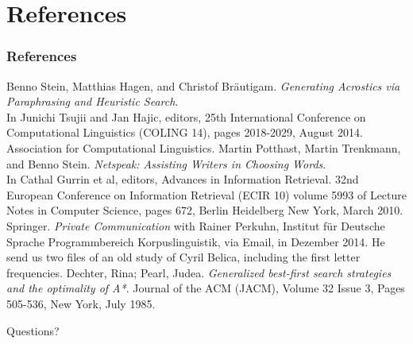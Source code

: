 \documentclass{beamer}
\begin{document}
\section{References}

\begin{frame}
\frametitle{References}
\scriptsize
\begin{thebibliography}{1}
	Benno Stein, Matthias Hagen, and Christof Bräutigam. \emph{Generating Acrostics via Paraphrasing and Heuristic Search}. \\
	In Junichi Tsujii and Jan Hajic, editors, 25th International Conference on Computational Linguistics (COLING 14), pages 2018-2029, August 2014. Association for Computational Linguistics.
	Martin Potthast, Martin Trenkmann, and Benno Stein.
	\emph{Netspeak: Assisting Writers in Choosing Words}. \\
	In Cathal Gurrin et al, editors, Advances in Information Retrieval. 32nd European Conference on Information Retrieval (ECIR 10) volume 5993 of Lecture Notes in Computer Science, pages 672, Berlin Heidelberg New York, March 2010. Springer.
\emph{Private Communication} with Rainer Perkuhn,
Institut für Deutsche Sprache Programmbereich Korpuslinguistik, via Email, in Dezember 2014. He send us two files of an old study of Cyril Belica, including the first letter frequencies.
	Dechter, Rina; Pearl, Judea. \emph{Generalized best-first search strategies and the optimality of A*}. Journal of the ACM (JACM), Volume 32 Issue 3, Pages 505-536, New York, July 1985.
\end{thebibliography}
\end{frame}

\begin{frame}
\Huge{\centerline{Questions?}}
\end{frame}

\end{document}
